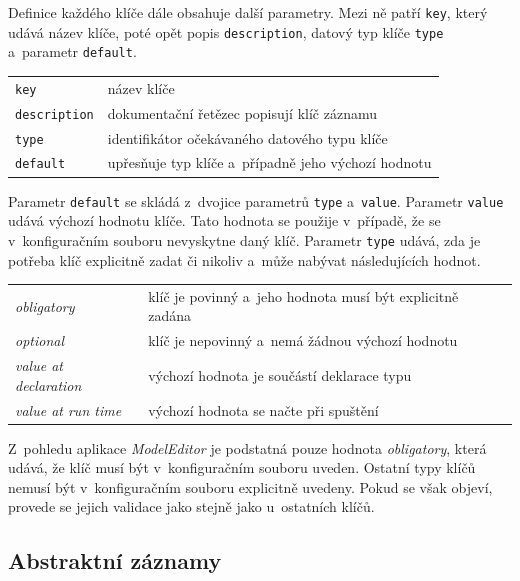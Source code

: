 \documentclass[FM,bw,DP]{tulthesis}
\begin{document}
Definice každého klíče dále obsahuje další parametry. Mezi ně patří \texttt{key}, který udává název klíče, poté opět popis \texttt{description}, datový typ klíče \texttt{type} a~parametr \texttt{default}.

\vspace{0.5cm}
\begin{tabular}{m{4cm}@{}l}
\texttt{key}\dotfill & název klíče \\
\texttt{description}\dotfill & dokumentační řetězec popisují klíč záznamu \\
\texttt{type}\dotfill & identifikátor očekávaného datového typu klíče \\
\texttt{default}\dotfill & upřesňuje typ klíče a~případně jeho výchozí hodnotu \\
\end{tabular}
\vspace{0.5cm}

Parametr \texttt{default} se skládá z~dvojice parametrů \texttt{type} a~\texttt{value}. Parametr \texttt{value} udává výchozí hodnotu klíče. Tato hodnota se použije v~případě, že se v~konfiguračním souboru nevyskytne daný klíč. Parametr \texttt{type} udává, zda je potřeba klíč explicitně zadat či nikoliv a~může nabývat následujících hodnot.

\begin{longtable}{m{4cm}@{}l}
\textit{obligatory}\dotfill & klíč je povinný a~jeho hodnota musí být explicitně zadána \\
\textit{optional}\dotfill & klíč je nepovinný a~nemá žádnou výchozí hodnotu \\
\textit{value at declaration}\dotfill & výchozí hodnota je součástí deklarace typu \\
\textit{value at run time}\dotfill & výchozí hodnota se načte při spuštění \\
\end{longtable}

Z~pohledu aplikace \textit{ModelEditor} je podstatná pouze hodnota \textit{obligatory}, která udává, že klíč musí být v~konfiguračním souboru uveden. Ostatní typy klíčů nemusí být v~konfiguračním souboru explicitně uvedeny. Pokud se však objeví, provede se jejich validace jako stejně jako u~ostatních klíčů.

\subsection{Abstraktní záznamy}
\label{sec:analyza-specifikace-formatu-abstraktni-zaznamy}
\end{document}
